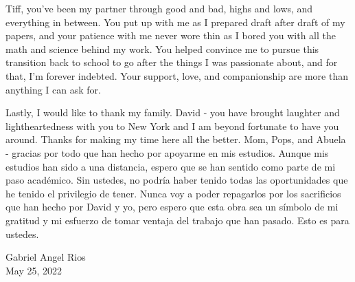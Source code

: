 \begin{singlespacing}
Tiff, you've been my partner through good and bad, highs and lows, and everything in between. You put up with me as I prepared draft after draft of my papers, and your patience with me never wore thin as I bored you with all the math and science behind my work. You helped convince me to pursue this transition back to school to go after the things I was passionate about, and for that, I'm forever indebted. Your support, love, and companionship are more than anything I can ask for.

Lastly, I would like to thank my family. David - you have brought laughter and lightheartedness with you to New York and I am beyond fortunate to have you around. Thanks for making my time here all the better. Mom, Pops, and Abuela - gracias por todo que han hecho por apoyarme en mis estudios. Aunque mis estudios han sido a una distancia, espero que se han sentido como parte de mi paso académico. Sin ustedes, no podría haber tenido todas las oportunidades que he tenido el privilegio de tener. Nunca voy a poder repagarlos por los sacrificios que han hecho por David y yo, pero espero que esta obra sea un símbolo de mi gratitud y mi esfuerzo de tomar ventaja del trabajo que han pasado. Esto es para ustedes. 

\vskip 1in
\end{singlespacing}

\noindent
Gabriel Angel Rios\\
May 25, 2022